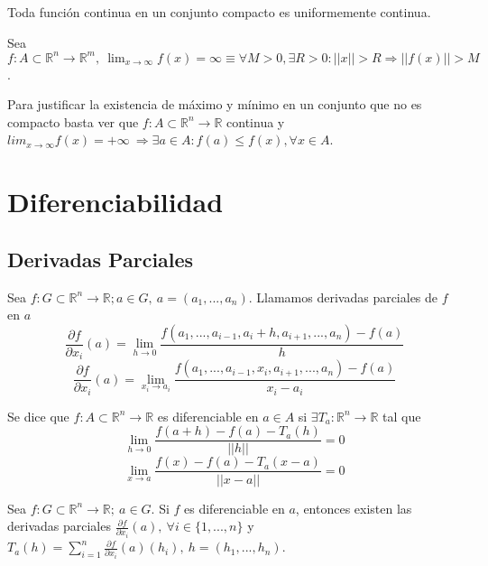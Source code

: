 \begin{theo}[de Heine]
Toda función continua en un conjunto compacto es uniformemente continua.
\end{theo}

\begin{obs}
Sea $f:A\subset \mathbb{R}^n \rightarrow \mathbb{R}^m, \ \lim_{x\rightarrow\infty} f(x) = \infty \equiv \forall M>0, \exists R>0: ||x||>R \Rightarrow ||f(x)||>M$. 
\end{obs}

\begin{obs}
Para justificar la existencia de máximo y mínimo en un conjunto que no es compacto basta ver que $f:A\subset \mathbb{R}^n \rightarrow \mathbb{R}$ continua y $lim_{x\rightarrow\infty} f(x) = +\infty \ \Rightarrow \exists a\in A: f(a)\leq f(x), \forall x\in A$.
\end{obs}

\chapter{Diferenciabilidad}

\section{Derivadas Parciales}

\begin{defn}
Sea $f:G\subset \mathbb{R}^n \rightarrow \mathbb{R}; a\in G, \ a = (a_1,...,a_n)$. Llamamos derivadas parciales de $f$ en $a$ \[ \frac{\partial f}{\partial x_i}(a) = \lim_{h\rightarrow 0} \frac{f(a_1,...,a_{i-1},a_{i} + h,a_{i+1},...,a_{n}) - f(a)}{h} \] \[  \frac{\partial f}{\partial x_i}(a) = \lim_{x_i\rightarrow a_i} \frac{f(a_1,...,a_{i-1},x_{i},a_{i+1},...,a_{n}) - f(a)}{x_i - a_i} \]
\end{defn}

\begin{defn}
Se dice que $f:A\subset \mathbb{R}^n \rightarrow \mathbb{R}$ es diferenciable en $a \in A$ si $\exists T_a: \mathbb{R}^n \rightarrow \mathbb{R}$ tal que \[ \lim_{h\rightarrow 0} \frac{f(a+h) - f(a) - T_a(h)}{||h||} = 0 \] \[ \lim_{x\rightarrow a} \frac{f(x) - f(a) - T_a(x - a)}{||x - a||} = 0\]
\end{defn}

\begin{prop}
Sea $f:G\subset \mathbb{R}^n \rightarrow \mathbb{R}; \ a\in G$. Si $f$ es diferenciable en $a$, entonces existen las derivadas parciales $\frac{\partial f}{\partial x_i}(a),\ \forall i\in\{1,...,n\}$ y $T_a(h) = \sum_{i=1}^n \frac{\partial f}{\partial x_i}(a)(h_i), \ h = (h_1,...,h_n)$.
\end{prop}

